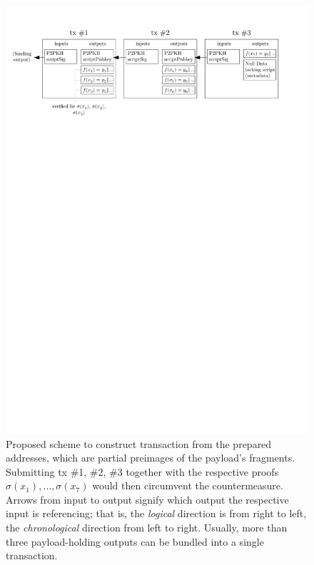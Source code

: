 \documentclass[a4paper,11pt,titlepage]{scrbook}
\begin{document}
\begin{figure}
    \centering
    \includegraphics[width=15cm,keepaspectratio]{figure.pdf}
    \caption[Proposed scheme to construct transaction from the prepared addresses to circumvent the countermeasure]{Proposed scheme to construct transaction from the prepared addresses, which are partial preimages of the payload's fragments. Submitting tx \#1, \#2, \#3 together with the respective proofs $\sigma(x_1), \dots, \sigma(x_7)$ would then circumvent the countermeasure. Arrows from input to output signify which output the respective input is referencing; that is, the \emph{logical} direction is from right to left, the \emph{chronological} direction from left to right. Usually, more than three payload-holding outputs can be bundled into a single transaction.}
    \label{fig:tx-construction}
\end{figure}
\end{document}
